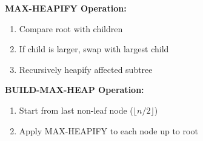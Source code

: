 \textbf{MAX-HEAPIFY Operation:}
\begin{enumerate}
\item Compare root with children
\item If child is larger, swap with largest child
\item Recursively heapify affected subtree
\end{enumerate}

\textbf{BUILD-MAX-HEAP Operation:}
\begin{enumerate}
\item Start from last non-leaf node ($\lfloor n/2 \rfloor$)
\item Apply MAX-HEAPIFY to each node up to root
\end{enumerate}
